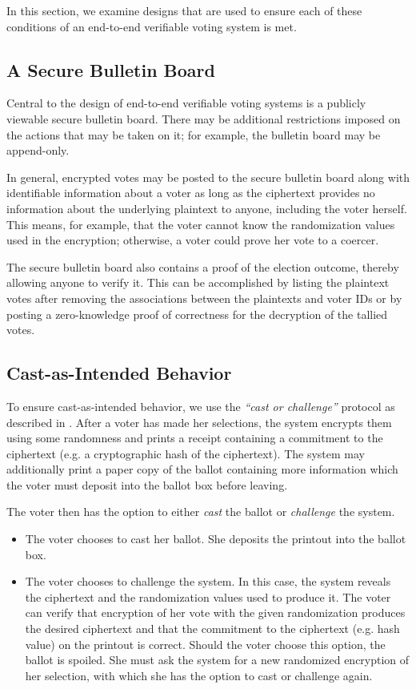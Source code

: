 In this section, we examine designs that are used to ensure each of these conditions of an end-to-end verifiable voting system is met.

\subsection{A Secure Bulletin Board} \label{evote:design:sbb}

Central to the design of end-to-end verifiable voting systems is a publicly viewable secure bulletin board. There may be additional restrictions imposed on the actions that may be taken on it; for example, the bulletin board may be append-only.

In general, encrypted votes may be posted to the secure bulletin board along with identifiable information about a voter as long as the ciphertext provides no information about the underlying plaintext to anyone, including the voter herself. This means, for example, that the voter cannot know the randomization values used in the encryption; otherwise, a voter could prove her vote to a coercer.

The secure bulletin board also contains a proof of the election outcome, thereby allowing anyone to verify it. This can be accomplished by listing the plaintext votes after removing the associations between the plaintexts and voter IDs or by posting a zero-knowledge proof of correctness for the decryption of the tallied votes.

\subsection{Cast-as-Intended Behavior} \label{evote:design:castasintended}

To ensure cast-as-intended behavior, we use the \emph{``cast or challenge''} protocol as described in \cite{neff04, benaloh06}. After a voter has made her selections, the system encrypts them using some randomness and prints a receipt containing a commitment to the ciphertext (e.g. a cryptographic hash of the ciphertext). The system may additionally print a paper copy of the ballot containing more information which the voter must deposit into the ballot box before leaving.

The voter then has the option to either \emph{cast} the ballot or \emph{challenge} the system.
\begin{itemize}
\item The voter chooses to cast her ballot. She deposits the printout into the ballot box.
\item The voter chooses to challenge the system. In this case, the system reveals the ciphertext and the randomization values used to produce it. The voter can verify that encryption of her vote with the given randomization produces the desired ciphertext and that the commitment to the ciphertext (e.g. hash value) on the printout is correct. Should the voter choose this option, the ballot is spoiled. She must ask the system for a new randomized encryption of her selection, with which she has the option to cast or challenge again.
\end{itemize}

